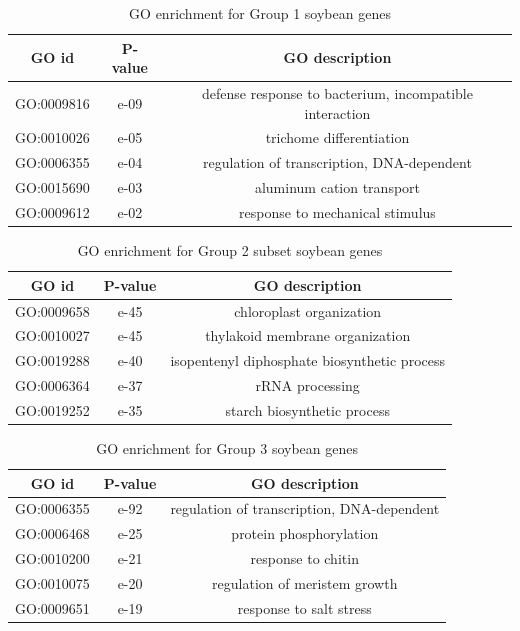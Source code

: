 \documentclass{article}
\begin{document}
		\begin{table}[h]
			\centering
			\begin{tabular}{|c |c |c |} 
				\hline
				GO id & P-value & GO description \\
				\hline\hline
				GO:0009816 & e-09 & defense response to bacterium, incompatible interaction \\ 
				\hline
				GO:0010026 & e-05 & trichome differentiation \\
				\hline
				GO:0006355 & e-04 & regulation of transcription, DNA-dependent \\
				\hline
				GO:0015690 & e-03 & aluminum cation transport \\
				\hline
				GO:0009612 & e-02 & response to mechanical stimulus \\ 
				\hline
			\end{tabular}
			\caption{GO enrichment for Group 1 soybean genes}
			\label{tab:gotable_group1}
		\end{table}
		
		\begin{table}[h]
			\centering
			\begin{tabular}{|c |c |c |} 
				\hline
				GO id & P-value & GO description \\
				\hline\hline
				GO:0009658 & e-45 & chloroplast organization \\ 
				\hline
				GO:0010027 & e-45 & thylakoid membrane organization \\
				\hline
				GO:0019288 & e-40 & isopentenyl diphosphate biosynthetic process \\
				\hline
				GO:0006364 & e-37 & rRNA processing \\
				\hline
				GO:0019252 & e-35 & starch biosynthetic process \\ 
				\hline
			\end{tabular}
			\caption{GO enrichment for Group 2 subset soybean genes}
			\label{tab:gotable_group2_subset}
		\end{table}
		
		\begin{table}[h]
			\centering
			\begin{tabular}{|c |c |c |} 
				\hline
				GO id & P-value & GO description \\
				\hline\hline
				GO:0006355 & e-92 & regulation of transcription, DNA-dependent \\ 
				\hline
				GO:0006468 & e-25 & protein phosphorylation \\
				\hline
				GO:0010200 & e-21 & response to chitin \\
				\hline
				GO:0010075 & e-20 & regulation of meristem growth \\
				\hline
				GO:0009651 & e-19 & response to salt stress \\ 
				\hline
			\end{tabular}
			\caption{GO enrichment for Group 3 soybean genes}
			\label{tab:gotable_group3}
		\end{table}
		
\end{document}
